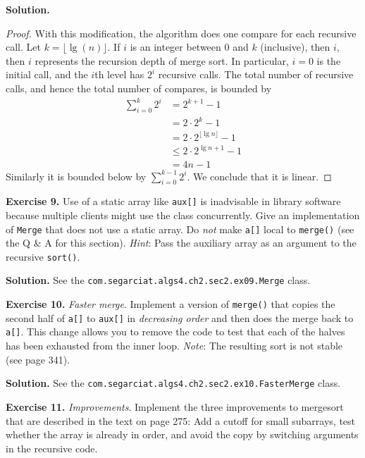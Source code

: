 \documentclass[12pt, a4paper]{article}
\newenvironment{ex}[2][Exercise]
{\par\medskip\noindent \textbf{#1 #2.}}
{\medskip}
\newenvironment{sol}[1][Solution]
{\par\medskip\noindent \textbf{#1.} }
{\medskip}
\begin{document}
	\begin{sol}
		\begin{proof}
			With this modification, the algorithm does one compare for each recursive call.
			Let $k=\lfloor \lg(n) \rfloor$. If $i$ is an integer between $0$ and $k$ (inclusive),
			then $i$, then $i$ represents the recursion depth of merge sort. In particular,
			$i=0$ is the initial call, and the $i$th level has $2^i$ recursive calls.
			The total number of recursive calls, and hence the total number of compares, is
			bounded by
			\begin{align*}
				\sum_{i=0}^{k}2^i&=2^{k+1}-1\\
				&=2\cdot 2^k-1\\
				&=2\cdot 2^{\lfloor \lg n\rfloor } -1\\
				&\leq 2\cdot 2^{\lg n +1}- 1\\
				&=4n-1
			\end{align*}
			Similarly it is bounded below by $\sum_{i=0}^{k-1}2^i$. We conclude that it is linear.
		\end{proof}
	\end{sol}
	\begin{ex}{9}
		Use of a static array like \texttt{aux[]} is inadvisable in library software because
		multiple clients might use the class concurrently. Give an implementation of \texttt{Merge}
		that does not use a static array. Do \emph{not} make \texttt{a[]} local to \texttt{merge()}
		(see the Q \& A for this section).
		\emph{Hint}: Pass the auxiliary array as an argument to the recursive \texttt{sort()}.
	\end{ex}
	\begin{sol}
		See the \texttt{com.segarciat.algs4.ch2.sec2.ex09.Merge} class.
	\end{sol}
	\begin{ex}{10}
		\emph{Faster merge}. Implement a version of \texttt{merge()} that copies the second half of
		\texttt{a[]} to \texttt{aux[]} in \emph{decreasing order} and then does the merge back to \texttt{a[]}.
		This change allows you to remove the code to test that each of the halves has been
		exhausted from the inner loop. \emph{Note}: The resulting sort is not stable
		(see page 341).
	\end{ex}
	\begin{sol}
		See the \texttt{com.segarciat.algs4.ch2.sec2.ex10.FasterMerge} class.
	\end{sol}
	\begin{ex}{11}
		\emph{Improvements}. Implement the three improvements to mergesort that are described
		in the text on page 275: Add a cutoff for small subarrays, test whether the array
		is already in order, and avoid the copy by switching arguments in the recursive code.
	\end{ex}
\end{document}
